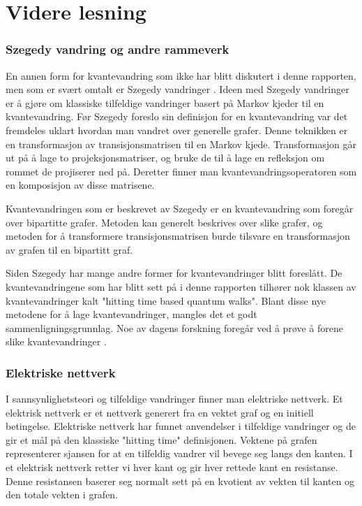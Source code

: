 \section{Videre lesning}

    \subsubsection*{Szegedy vandring og andre rammeverk}
    
        En annen form for kvantevandring som ikke har blitt diskutert i denne rapporten, men som er svært omtalt er Szegedy vandringer \cite{dewolf2021quantum}\cite{Venegas_Andraca_2012}\cite{portugal_2019}. Ideen med Szegedy vandringer er å gjøre om klassiske tilfeldige vandringer basert på Markov kjeder til en kvantevandring. Før Szegedy foreslo sin definisjon for en kvantevandring var det fremdeles uklart hvordan man vandret over generelle grafer. Denne teknikken er en transformasjon av transisjonsmatrisen til en Markov kjede. Transformasjon går ut på å lage to projeksjonsmatriser, og bruke de til å lage en refleksjon om rommet de projiserer ned på. Deretter finner man kvantevandringsoperatoren som en komposisjon av disse matrisene. 
        
        Kvantevandringen som er beskrevet av Szegedy er en kvantevandring som foregår over bipartitte grafer. Metoden kan generelt beskrives over slike grafer, og metoden for å transformere transisjonsmatrisen burde tilsvare en transformasjon av grafen til en bipartitt graf.
        
        Siden Szegedy har mange andre former for kvantevandringer blitt foreslått. De kvantevandringene som har blitt sett på i denne rapporten tilhører nok klassen av kvantevandringer kalt "hitting time based quantum walks". Blant disse nye metodene for å lage kvantevandringer, mangles det et godt sammenligningsgrunnlag. Noe av dagens forskning foregår ved å prøve å forene slike kvantevandringer \cite{apers2019unified}.

    \subsubsection*{Elektriske nettverk}
    
        I sannsynlighetsteori og tilfeldige vandringer finner man elektriske nettverk. Et elektrisk nettverk er et nettverk generert fra en vektet graf og en initiell betingelse. Elektriske nettverk har funnet anvendelser i tilfeldige vandringer og de gir et mål på den klassiske "hitting time" definisjonen. Vektene på grafen representerer sjansen for at en tilfeldig vandrer vil bevege seg langs den kanten. I et elektrisk nettverk retter vi hver kant og gir hver rettede kant en resistanse. Denne resistansen baserer seg normalt sett på en kvotient av vekten til kanten og den totale vekten i grafen.
        
